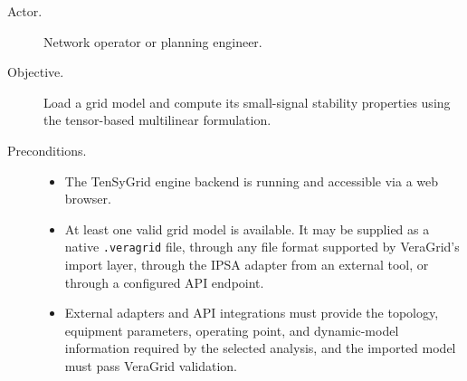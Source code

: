 \begin{description}
  \item[Actor.] Network operator or planning engineer.
  \item[Objective.] Load a grid model and compute its small-signal stability properties using the tensor-based multilinear formulation.
  \item[Preconditions.]
        \begin{itemize}[before=\leavevmode, leftmargin=*]
          \item The TenSyGrid engine backend is running and accessible via a web browser.
          \item At least one valid grid model is available. It may be supplied as a native \texttt{.veragrid} file, through any file format supported by VeraGrid's import layer, through the IPSA adapter from an external tool, or through a configured API endpoint.
          \item External adapters and API integrations must provide the topology, equipment parameters, operating point, and dynamic-model information required by the selected analysis, and the imported model must pass VeraGrid validation.
        \end{itemize}


\end{description}
